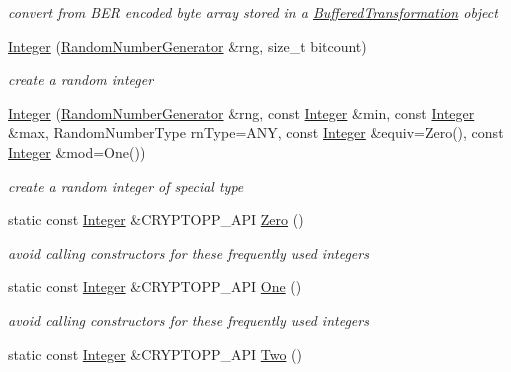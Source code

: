 \begin{DoxyCompactItemize}
\begin{DoxyCompactList}\small\item\em convert from BER encoded byte array stored in a \hyperlink{class_buffered_transformation}{BufferedTransformation} object \item\end{DoxyCompactList}\item 
\hyperlink{class_integer_aeb4abb834e9e897a28850d2081f3fa63}{Integer} (\hyperlink{class_random_number_generator}{RandomNumberGenerator} \&rng, size\_\-t bitcount)
\begin{DoxyCompactList}\small\item\em create a random integer \item\end{DoxyCompactList}\item 
\hyperlink{class_integer_a88a110cb9f89a8810c228ad00cea18c2}{Integer} (\hyperlink{class_random_number_generator}{RandomNumberGenerator} \&rng, const \hyperlink{class_integer}{Integer} \&min, const \hyperlink{class_integer}{Integer} \&max, RandomNumberType rnType=ANY, const \hyperlink{class_integer}{Integer} \&equiv=Zero(), const \hyperlink{class_integer}{Integer} \&mod=One())
\begin{DoxyCompactList}\small\item\em create a random integer of special type \item\end{DoxyCompactList}\item 
\hypertarget{class_integer_a6431ff6bf298c38135564808eab41c83}{
static const \hyperlink{class_integer}{Integer} \&CRYPTOPP\_\-API \hyperlink{class_integer_a6431ff6bf298c38135564808eab41c83}{Zero} ()}
\label{class_integer_a6431ff6bf298c38135564808eab41c83}

\begin{DoxyCompactList}\small\item\em avoid calling constructors for these frequently used integers \item\end{DoxyCompactList}\item 
\hypertarget{class_integer_abb1f197b5176b3f6867043941bf5cf5f}{
static const \hyperlink{class_integer}{Integer} \&CRYPTOPP\_\-API \hyperlink{class_integer_abb1f197b5176b3f6867043941bf5cf5f}{One} ()}
\label{class_integer_abb1f197b5176b3f6867043941bf5cf5f}

\begin{DoxyCompactList}\small\item\em avoid calling constructors for these frequently used integers \item\end{DoxyCompactList}\item 
\hypertarget{class_integer_a58ac2a81ae74f184a823c1e871f8a0ec}{
static const \hyperlink{class_integer}{Integer} \&CRYPTOPP\_\-API \hyperlink{class_integer_a58ac2a81ae74f184a823c1e871f8a0ec}{Two} ()}
\label{class_integer_a58ac2a81ae74f184a823c1e871f8a0ec}


\end{DoxyCompactItemize}
